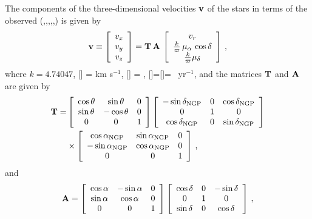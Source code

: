 The components of the three-dimensional velocities $\boldsymbol{\mathbf{v}}$ of the stars
in terms of the observed (\ra,\dec,\parallax,\pmra,\pmdec,\vrr) is
given by
\begin{equation}\label{eq:vrpmrapmdectoUVW2}
\boldsymbol{\mathbf{v}} \equiv \left[ \begin{array}{c} v_x \\ v_y \\ v_z \end{array} \right] =
\mathbf{T} \, \mathbf{A} \, \left[ \begin{array}{c} v_r  \\ \frac{k}{\varpi}\,\mu_{\alpha}\,\cos\delta\\\frac{k}{\varpi}\mu_{\delta}\end{array} \right]\, ,
\end{equation}
where $k =  4.74047$, [\vrr] = km s$^{-1}$, [\parallax] = \arcsecs,
[\pmra]=[\pmdec]= \arcsecs\ yr$^{-1}$, and the matrices $\mathbf{T}$ and $\mathbf{A}$
are given by
\begin{equation}\label{eq:radectolbT}
\begin{split}
\mathbf{T} = &  \left[ \begin{array}{ccc} \cos \theta & \sin \theta & 0\\\sin \theta & -\cos \theta & 0\\0&0&1 \end{array} \right]
\left[ \begin{array}{ccc} -\sin \delta_{\textnormal{NGP}} & 0 & \cos \delta_{\textnormal{NGP}}\\ 0 & 1 & 0 \\ \cos \delta_{\textnormal{NGP}} & 0 & \sin \delta_{\textnormal{NGP}}\end{array} \right]\\
& \times
\left[ \begin{array}{ccc} \cos \alpha_{\textnormal{NGP}} &\sin\alpha_{\textnormal{NGP}}&0\\ -\sin\alpha_{\textnormal{NGP}} & \cos\alpha_{\textnormal{NGP}}&0\\ 0&0&1\end{array} \right]\, ,
\end{split}
\end{equation}
and
\begin{equation}
\mathbf{A} = \left[ \begin{array}{ccc} \cos \alpha & -\sin \alpha & 0 \\ \sin \alpha & \cos \alpha & 0 \\ 0 & 0& 1 \end{array} \right]
\left[ \begin{array}{ccc} \cos \delta & 0 & -\sin \delta\\ 0 & 1 & 0 \\ \sin \delta  & 0 & \cos\delta\end{array} \right]\, ,
\end{equation}
